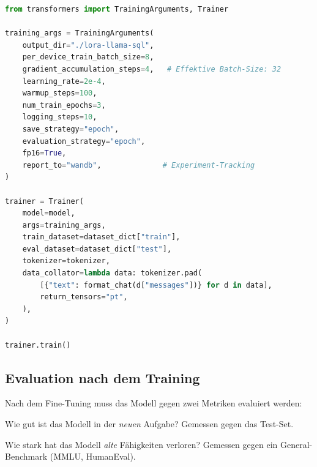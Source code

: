 \begin{lstlisting}[language=Python, caption=Fine-Tuning mit Hugging Face Trainer]
from transformers import TrainingArguments, Trainer

training_args = TrainingArguments(
    output_dir="./lora-llama-sql",
    per_device_train_batch_size=8,
    gradient_accumulation_steps=4,   # Effektive Batch-Size: 32
    learning_rate=2e-4,
    warmup_steps=100,
    num_train_epochs=3,
    logging_steps=10,
    save_strategy="epoch",
    evaluation_strategy="epoch",
    fp16=True,
    report_to="wandb",              # Experiment-Tracking
)

trainer = Trainer(
    model=model,
    args=training_args,
    train_dataset=dataset_dict["train"],
    eval_dataset=dataset_dict["test"],
    tokenizer=tokenizer,
    data_collator=lambda data: tokenizer.pad(
        [{"text": format_chat(d["messages"])} for d in data],
        return_tensors="pt",
    ),
)

trainer.train()
\end{lstlisting}

\subsection{Evaluation nach dem Training}

Nach dem Fine-Tuning muss das Modell gegen zwei Metriken evaluiert werden:

\begin{description}[leftmargin=*,style=nextline]
    \item[Task-Performance] Wie gut ist das Modell in der \textit{neuen} Aufgabe? Gemessen gegen das Test-Set.
    \item[Catastrophic Forgetting] Wie stark hat das Modell \textit{alte} Fähigkeiten verloren? Gemessen gegen ein General-Benchmark (MMLU, HumanEval).
\end{description}

